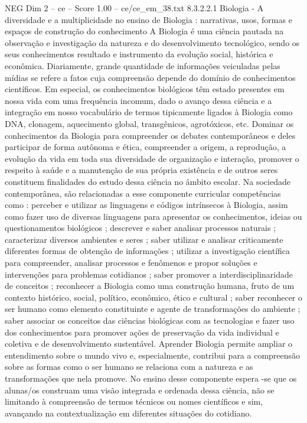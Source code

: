 \begin{textsample}{NEG Dim 2 – ce – Score 1.00 – ce/ce\_em\_38.txt}  \label{ex:f2_neg_209}
8.3.2.2.1 Biologia - A diversidade e a multiplicidade no ensino de Biologia : narrativas, usos, formas e espaços de construção do conhecimento A Biologia é uma ciência pautada na observação e investigação da natureza e do desenvolvimento tecnológico, sendo os seus conhecimentos resultado e instrumento da evolução social, histórica e econômica.
Diariamente, grande quantidade de informações veiculadas pelas mídias se refere a fatos cuja compreensão depende do domínio de conhecimentos científicos.
Em especial, os conhecimentos biológicos têm estado presentes em nossa vida com uma frequência incomum, dado o avanço dessa ciência e a integração em nosso vocabulário de termos tipicamente ligados à Biologia como DNA, clonagem, aquecimento global, transgênicos, agrotóxicos, etc.
Dominar os conhecimentos da Biologia para compreender os debates contemporâneos e deles participar de forma autônoma e ética, compreender a origem, a reprodução, a evolução da vida em toda sua diversidade de organização e interação, promover o respeito à saúde e a manutenção de sua própria existência e de outros seres constituem finalidades do estudo dessa ciência no âmbito escolar.
Na sociedade contemporânea, são relacionadas a esse componente curricular competências como : perceber e utilizar as linguagens e códigos intrínsecos à Biologia, assim como fazer uso de diversas linguagens para apresentar os conhecimentos, ideias ou questionamentos biológicos ; descrever e saber analisar processos naturais ; caracterizar diversos ambientes e seres ; saber utilizar e analisar criticamente diferentes formas de obtenção de informações ; utilizar a investigação científica para compreender, analisar processos e fenômenos e propor soluções e intervenções para problemas cotidianos ; saber promover a interdisciplinaridade de conceitos ; reconhecer a Biologia como uma construção humana, fruto de um contexto histórico, social, político, econômico, ético e cultural ; saber reconhecer o ser humano como elemento constituinte e agente de transformações do ambiente ; saber associar os conceitos das ciências biológicas com as tecnologias e fazer uso dos conhecimentos para promover ações de preservação da vida individual e coletiva e de desenvolvimento sustentável.
Aprender Biologia permite ampliar o entendimento sobre o mundo vivo e, especialmente, contribui para a compreensão sobre as formas como o ser humano se relaciona com a natureza e as transformações que nela promove.
No ensino desse componente espera -se que os alunas/os construam uma visão integrada e ordenada dessa ciência, não se limitando à compreensão de termos técnicos ou nomes científicos e sim, avançando na contextualização em diferentes situações do cotidiano.

\end{textsample}
